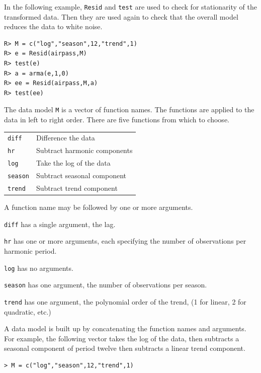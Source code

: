 \documentclass[11pt]{article}
\begin{document}
\bigskip
\noindent
In the following example, {\tt Resid} and {\tt test}
are used
to check for stationarity of the transformed
data.
Then they are used again to check that the overall
model reduces the data to white noise.

\begin{verbatim}
R> M = c("log","season",12,"trend",1)
R> e = Resid(airpass,M)
R> test(e)
R> a = arma(e,1,0)
R> ee = Resid(airpass,M,a)
R> test(ee)
\end{verbatim}

\noindent
The data model {\tt M} is a vector of function names.
The functions are applied to the data in left to right order.
There are five functions from which to choose.

\begin{center}
\begin{tabular}{ll}
{\tt diff} & Difference the data\\
{\tt hr} & Subtract harmonic components\\
{\tt log} & Take the log of the data\\
{\tt season} & Subtract seasonal component\\
{\tt trend} & Subtract trend component\\
\end{tabular}
\end{center}

\noindent
A function name may be followed by one or more arguments.

\medskip
\noindent
{\tt diff} has a single argument, the lag.

\medskip
\noindent
{\tt hr} has one or more arguments, each specifying the number
of observations per harmonic period.

\medskip
\noindent
{\tt log} has no arguments.

\medskip
\noindent
{\tt season} has one argument, the number of observations per season.

\medskip
\noindent
{\tt trend} has one argument, the polynomial order of the trend,
(1 for linear, 2 for quadratic, etc.)

\bigskip
\noindent
A data model is built up by concatenating the function
names and arguments. For example, the following vector takes the
log of the data, then subtracts a seasonal component of period twelve
then subtracts a linear trend component.

\begin{verbatim}
> M = c("log","season",12,"trend",1)
\end{verbatim}
\end{document}
